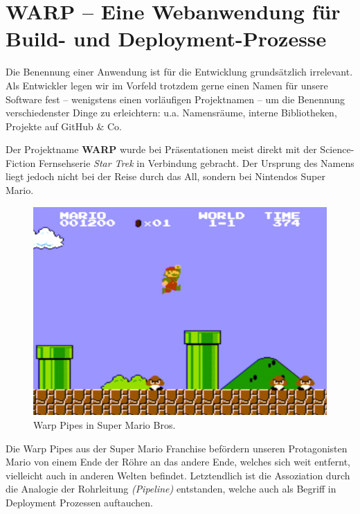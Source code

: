 
\chapter{WARP – Eine Webanwendung für Build- und Deployment-Prozesse}

Die Benennung einer Anwendung ist für die Entwicklung grundsätzlich irrelevant. Als Entwickler legen wir im Vorfeld trotzdem gerne einen Namen für unsere Software fest – wenigstens einen vorläufigen Projektnamen – um die Benennung verschiedenster Dinge zu erleichtern: u.a. Namensräume, interne Bibliotheken, Projekte auf GitHub \& Co.

Der Projektname \textbf{WARP} wurde bei Präsentationen meist direkt mit der Science-Fiction Fernsehserie \emph{Star Trek} in Verbindung gebracht. Der Ursprung des Namens liegt jedoch nicht bei der Reise durch das All, sondern bei Nintendos Super Mario.

\begin{figure}[H]
  \caption{Warp Pipes in Super Mario Bros.}
  \label{fig:super-mario-warp-pipes}
  \centering
    \includegraphics[width=.5\textwidth]{assets/mario-pipes}
\end{figure}

Die Warp Pipes aus der Super Mario Franchise befördern unseren Pro\-ta\-go\-nisten Mario von einem Ende der Röhre an das andere Ende, welches sich weit entfernt, vielleicht auch in anderen Welten befindet. Letztendlich ist die Assoziation durch die Analogie der Rohrleitung \emph{(Pipeline)} entstanden, welche auch als Begriff in Deployment Prozessen auftauchen.

